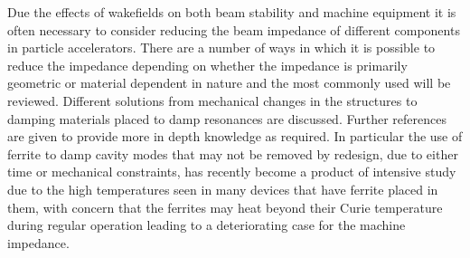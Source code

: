 Due the effects of wakefields on both beam stability and machine equipment it is often necessary to consider reducing the beam impedance of different components in particle accelerators. There are a number of ways in which it is possible to reduce the impedance depending on whether the impedance is primarily geometric or material dependent in nature and the most commonly used will be reviewed. Different solutions from mechanical changes in the structures to damping materials placed to damp resonances are discussed. Further references are given to provide more in depth knowledge as required. In particular the use of ferrite to damp cavity modes that may not be removed by redesign, due to either time or mechanical constraints, has recently become a product of intensive study due to the high temperatures seen in many devices that have ferrite placed in them, with concern that the ferrites may heat beyond their Curie temperature during regular operation leading to a deteriorating case for the machine impedance. 